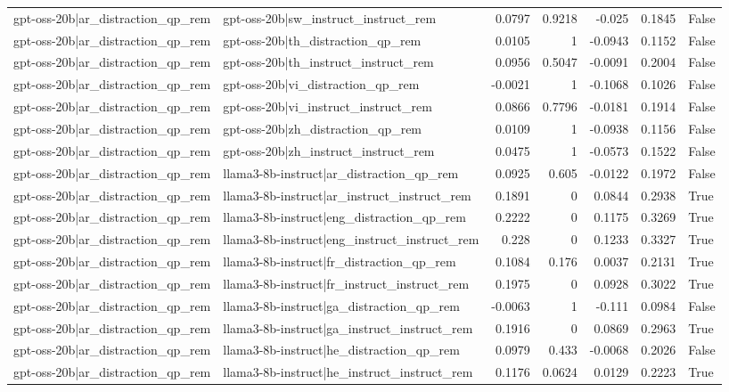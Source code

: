 \begin{table}
\begin{tabular}{l l r r r r l}
gpt-oss-20b|ar_distraction_qp_rem & gpt-oss-20b|sw_instruct_instruct_rem & 0.0797 & 0.9218 & -0.025 & 0.1845 & False \\
gpt-oss-20b|ar_distraction_qp_rem & gpt-oss-20b|th_distraction_qp_rem & 0.0105 & 1 & -0.0943 & 0.1152 & False \\
gpt-oss-20b|ar_distraction_qp_rem & gpt-oss-20b|th_instruct_instruct_rem & 0.0956 & 0.5047 & -0.0091 & 0.2004 & False \\
gpt-oss-20b|ar_distraction_qp_rem & gpt-oss-20b|vi_distraction_qp_rem & -0.0021 & 1 & -0.1068 & 0.1026 & False \\
gpt-oss-20b|ar_distraction_qp_rem & gpt-oss-20b|vi_instruct_instruct_rem & 0.0866 & 0.7796 & -0.0181 & 0.1914 & False \\
gpt-oss-20b|ar_distraction_qp_rem & gpt-oss-20b|zh_distraction_qp_rem & 0.0109 & 1 & -0.0938 & 0.1156 & False \\
gpt-oss-20b|ar_distraction_qp_rem & gpt-oss-20b|zh_instruct_instruct_rem & 0.0475 & 1 & -0.0573 & 0.1522 & False \\
gpt-oss-20b|ar_distraction_qp_rem & llama3-8b-instruct|ar_distraction_qp_rem & 0.0925 & 0.605 & -0.0122 & 0.1972 & False \\
gpt-oss-20b|ar_distraction_qp_rem & llama3-8b-instruct|ar_instruct_instruct_rem & 0.1891 & 0 & 0.0844 & 0.2938 & True \\
gpt-oss-20b|ar_distraction_qp_rem & llama3-8b-instruct|eng_distraction_qp_rem & 0.2222 & 0 & 0.1175 & 0.3269 & True \\
gpt-oss-20b|ar_distraction_qp_rem & llama3-8b-instruct|eng_instruct_instruct_rem & 0.228 & 0 & 0.1233 & 0.3327 & True \\
gpt-oss-20b|ar_distraction_qp_rem & llama3-8b-instruct|fr_distraction_qp_rem & 0.1084 & 0.176 & 0.0037 & 0.2131 & True \\
gpt-oss-20b|ar_distraction_qp_rem & llama3-8b-instruct|fr_instruct_instruct_rem & 0.1975 & 0 & 0.0928 & 0.3022 & True \\
gpt-oss-20b|ar_distraction_qp_rem & llama3-8b-instruct|ga_distraction_qp_rem & -0.0063 & 1 & -0.111 & 0.0984 & False \\
gpt-oss-20b|ar_distraction_qp_rem & llama3-8b-instruct|ga_instruct_instruct_rem & 0.1916 & 0 & 0.0869 & 0.2963 & True \\
gpt-oss-20b|ar_distraction_qp_rem & llama3-8b-instruct|he_distraction_qp_rem & 0.0979 & 0.433 & -0.0068 & 0.2026 & False \\
gpt-oss-20b|ar_distraction_qp_rem & llama3-8b-instruct|he_instruct_instruct_rem & 0.1176 & 0.0624 & 0.0129 & 0.2223 & True \\

\end{tabular}
\end{table}
